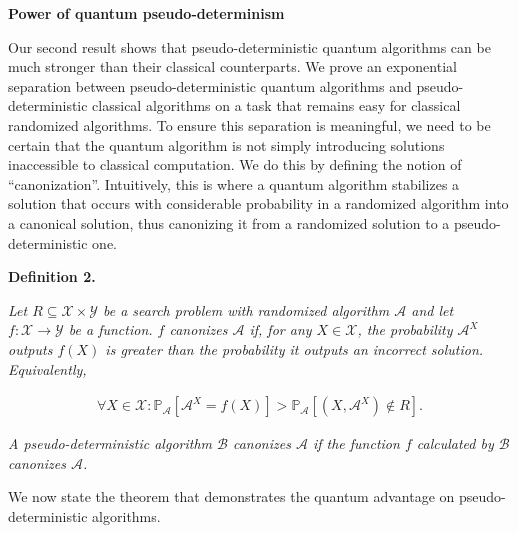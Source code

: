\par\medskip\noindent\textbf{Power of quantum pseudo-determinism}\par




Our second result shows that pseudo-deterministic quantum algorithms can be much stronger than their classical counterparts. We prove an exponential separation between pseudo-deterministic quantum algorithms and pseudo-deterministic classical algorithms on a task that remains easy for classical randomized algorithms. To ensure this separation is meaningful, we need to be certain that the quantum algorithm is not simply introducing solutions inaccessible to classical computation. We do this by defining the notion of “canonization”. Intuitively, this is where a quantum algorithm stabilizes a solution that occurs with considerable probability in a randomized algorithm into a canonical solution, thus canonizing it from a randomized solution to a pseudo-deterministic one.\par





\par\medskip\noindent\textbf{
\textbf{Definition 2}\textbf{.}
}\par



\emph{Let ${R}\subseteq\mathcal{X}\times\mathcal{Y}$ be a search problem with randomized algorithm $\mathcal{A}$ and let $f:\mathcal{X}\rightarrow\mathcal{Y}$ be a function. $f$ canonizes $\mathcal{A}$ if, for any $X\in\mathcal{X}$, the probability $\mathcal{A}^{X}$ outputs $f(X)$ is greater than the probability it outputs an incorrect solution. Equivalently,}\par


\[\begin{gathered}
\forall X\in\mathcal{X}:\mathbb{P}_{\mathcal{A}}[\mathcal{A}^{X}=f(X)]>\mathbb{P}_{\mathcal{A}}[(X,\mathcal{A}^{X})\not\in{R}].
\end{gathered}\]


\emph{A pseudo-deterministic algorithm $\mathcal{B}$ canonizes $\mathcal{A}$ if the function $f$ calculated by $\mathcal{B}$ canonizes $\mathcal{A}$.}\par






We now state the theorem that demonstrates the quantum advantage on pseudo-deterministic algorithms.\par




